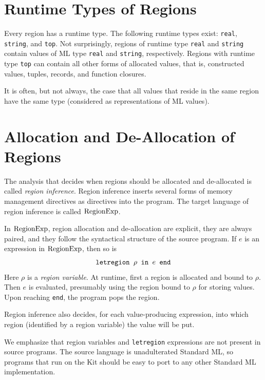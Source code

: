 \documentclass[12pt]{book}
\begin{document}
\section{Runtime Types of Regions}
\label{runtimetypes.sec}
Every region has a 
%
runtime type. The following runtime types exist: {\tt real}, {\tt
  string}, and {\tt top}. Not surprisingly, regions of runtime type
{\tt real} and {\tt string} contain values of ML type {\tt real} and
{\tt string}, respectively.  Regions with runtime type {\tt top} can
contain all other forms of allocated values, that is, constructed
values, tuples, records, and function closures.

It is often, but not always, the case that all values that reside in
the same region have the same type (considered as representations of
ML values).
 
\section{Allocation and De-Allocation of Regions}
\label{aldeal.sec}
The analysis that decides when regions should be allocated and
de-allocated is called {\em region inference}. Region inference
inserts several forms of memory management directives as directives
into the program.  The target language of region inference is called
%
$\hbox{\rm RegionExp}$.

In $\hbox{\rm RegionExp}$, region allocation and de-allocation are explicit, they
are always paired, and they follow the syntactical structure of the
source program.  If $e$ is an expression in $\hbox{\rm RegionExp}$, then so is
%
$$\hbox{\tt letregion $\rho$ in $e$ end}$$
Here $\rho$ is a 
%
{\em region variable}. At runtime, first a region is allocated and
bound to $\rho$. Then $e$ is evaluated, presumably using the region
bound to $\rho$ for storing values. Upon reaching {\tt end}, the
program pops the region.

Region inference also decides, for each value-producing expression,
into which region (identified by a region variable) the value will be
put.

We emphasize that region variables and {\tt letregion} expressions are
not present in source programs. The source language is unadulterated
Standard ML, so programs that run on the Kit should be easy to port to
any other Standard ML implementation.

\end{document}
